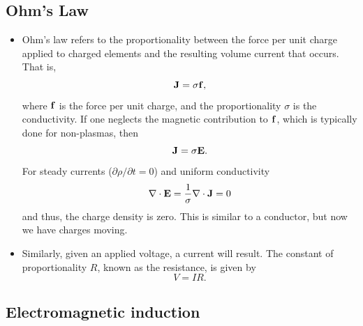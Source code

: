\documentclass[a4paper,11pt]{report}
\begin{document}
\subsection{Ohm's Law}
\begin{itemize}
\item Ohm's law refers to the proportionality between the force per unit charge applied to charged elements and the resulting volume current that occurs. That is,
\begin{equation}
\mathbf{J} = \sigma \mathbf{f}, 
\end{equation}
where $\mathbf{f}$ is the force per unit charge, and the proportionality $\sigma$ is the conductivity. If one neglects the magnetic contribution to $\mathbf{f}$, which is typically done for non-plasmas, then
\begin{equation}
\mathbf{J} = \sigma \mathbf{E}.
\end{equation}
For steady currents ($\partial \rho/\partial t = 0$) and uniform conductivity
\begin{equation}
\nabla \cdot \mathbf{E} = \frac{1}{\sigma} \nabla \cdot \mathbf{J} = 0
\end{equation}
 and thus, the charge density is zero. This is similar to a conductor, but now we have charges moving.

\item Similarly, given an applied voltage, a current will result. The constant of proportionality $R$, known as the resistance, is given by 
\begin{equation}
V = IR.
\end{equation}

\end{itemize}

\subsection{Electromagnetic induction}
\end{document}
